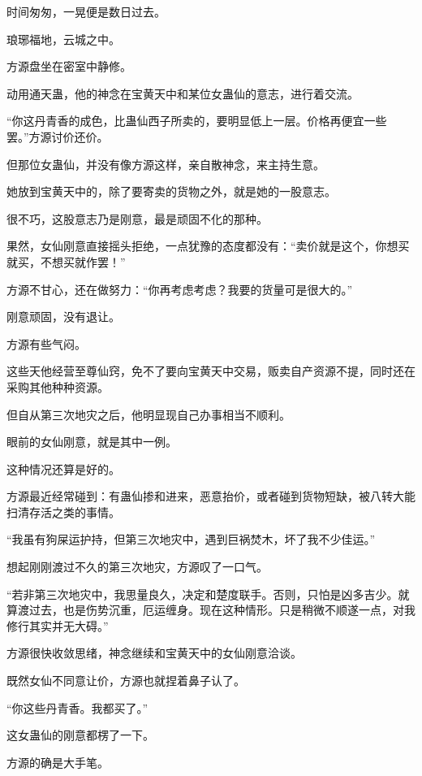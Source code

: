 
\begin{this_body}

时间匆匆，一晃便是数日过去。

琅琊福地，云城之中。

方源盘坐在密室中静修。

动用通天蛊，他的神念在宝黄天中和某位女蛊仙的意志，进行着交流。

“你这丹青香的成色，比蛊仙西子所卖的，要明显低上一层。价格再便宜一些罢。”方源讨价还价。

但那位女蛊仙，并没有像方源这样，亲自散神念，来主持生意。

她放到宝黄天中的，除了要寄卖的货物之外，就是她的一股意志。

很不巧，这股意志乃是刚意，最是顽固不化的那种。

果然，女仙刚意直接摇头拒绝，一点犹豫的态度都没有：“卖价就是这个，你想买就买，不想买就作罢！”

方源不甘心，还在做努力：“你再考虑考虑？我要的货量可是很大的。”

刚意顽固，没有退让。

方源有些气闷。

这些天他经营至尊仙窍，免不了要向宝黄天中交易，贩卖自产资源不提，同时还在采购其他种种资源。

但自从第三次地灾之后，他明显现自己办事相当不顺利。

眼前的女仙刚意，就是其中一例。

这种情况还算是好的。

方源最近经常碰到：有蛊仙掺和进来，恶意抬价，或者碰到货物短缺，被八转大能扫清存活之类的事情。

“我虽有狗屎运护持，但第三次地灾中，遇到巨祸焚木，坏了我不少佳运。”

想起刚刚渡过不久的第三次地灾，方源叹了一口气。

“若非第三次地灾中，我思量良久，决定和楚度联手。否则，只怕是凶多吉少。就算渡过去，也是伤势沉重，厄运缠身。现在这种情形。只是稍微不顺遂一点，对我修行其实并无大碍。”

方源很快收敛思绪，神念继续和宝黄天中的女仙刚意洽谈。

既然女仙不同意让价，方源也就捏着鼻子认了。

“你这些丹青香。我都买了。”

这女蛊仙的刚意都楞了一下。

方源的确是大手笔。


\end{this_body}
